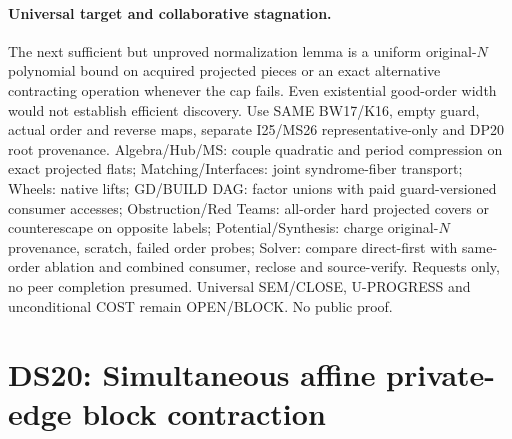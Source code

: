 \documentclass[11pt]{article}
\begin{document}
\paragraph{Universal target and collaborative stagnation.}
The next sufficient but unproved normalization lemma is a uniform original-$N$ polynomial bound on acquired projected pieces or an exact alternative contracting operation whenever the cap fails. Even existential good-order width would not establish efficient discovery. Use SAME BW17/K16, empty guard, actual order and reverse maps, separate I25/MS26 representative-only and DP20 root provenance. Algebra/Hub/MS: couple quadratic and period compression on exact projected flats; Matching/Interfaces: joint syndrome-fiber transport; Wheels: native lifts; GD/BUILD DAG: factor unions with paid guard-versioned consumer accesses; Obstruction/Red Teams: all-order hard projected covers or counterescape on opposite labels; Potential/Synthesis: charge original-$N$ provenance, scratch, failed order probes; Solver: compare direct-first with same-order ablation and combined consumer, reclose and source-verify. Requests only, no peer completion presumed. Universal SEM/CLOSE, U-PROGRESS and unconditional COST remain OPEN/BLOCK. No public proof.


\section{DS20: Simultaneous affine private-edge block contraction}\label{sec:ds20}
\end{document}
